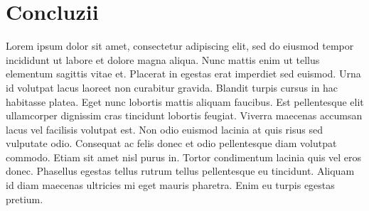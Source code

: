 \chapter*{Concluzii} 

Lorem ipsum dolor sit amet, consectetur adipiscing elit, sed do eiusmod tempor incididunt ut labore et dolore magna aliqua. Nunc mattis enim ut tellus elementum sagittis vitae et. Placerat in egestas erat imperdiet sed euismod. Urna id volutpat lacus laoreet non curabitur gravida. Blandit turpis cursus in hac habitasse platea. Eget nunc lobortis mattis aliquam faucibus. Est pellentesque elit ullamcorper dignissim cras tincidunt lobortis feugiat. Viverra maecenas accumsan lacus vel facilisis volutpat est. Non odio euismod lacinia at quis risus sed vulputate odio. Consequat ac felis donec et odio pellentesque diam volutpat commodo. Etiam sit amet nisl purus in. Tortor condimentum lacinia quis vel eros donec. Phasellus egestas tellus rutrum tellus pellentesque eu tincidunt. Aliquam id diam maecenas ultricies mi eget mauris pharetra. Enim eu turpis egestas pretium.